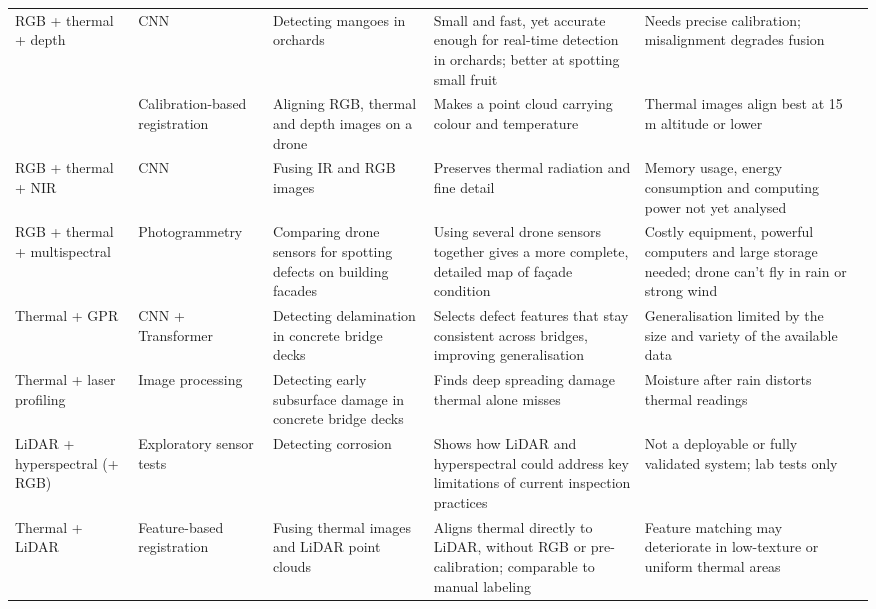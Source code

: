 {\begin{xltabular}{\textwidth}{>{\RaggedRight\arraybackslash}p{1.6cm}>{\RaggedRight\arraybackslash}p{2.2cm}>{\RaggedRight\arraybackslash}p{2.3cm}>{\RaggedRight\arraybackslash}X>{\RaggedRight\arraybackslash}Xp{0.95cm}}
\midrule
RGB + thermal + depth & CNN & Detecting mangoes in orchards & Small and fast, yet accurate enough for real-time detection in orchards; better at spotting small fruit & Needs precise calibration; misalignment degrades fusion & \citep{Cao2026} \\
 & Calibration-based registration & Aligning RGB, thermal and depth images on a drone & Makes a point cloud carrying colour and temperature & Thermal images align best at 15 m altitude or lower & \citep{Nooralishahi2022} \\
\midrule
RGB + thermal + NIR & CNN & Fusing IR and RGB images & Preserves thermal radiation and fine detail & Memory usage, energy consumption and computing power not yet analysed & \citep{Laidouni2025} \\
\midrule
RGB + thermal + multispectral & Photogrammetry & Comparing drone sensors for spotting defects on building facades & Using several drone sensors together gives a more complete, detailed map of façade condition & Costly equipment, powerful computers and large storage needed; drone can't fly in rain or strong wind & \citep{Guedes2025} \\
\midrule
Thermal + GPR & CNN + Transformer & Detecting delamination in concrete bridge decks & Selects defect features that stay consistent across bridges, improving generalisation & Generalisation limited by the size and variety of the available data & \citep{Rashidi2026} \\
\midrule
Thermal + laser profiling & Image processing & Detecting early subsurface damage in concrete bridge decks & Finds deep spreading damage thermal alone misses & Moisture after rain distorts thermal readings & \citep{Yamashita2025} \\
\midrule
LiDAR + hyperspectral (+ RGB) & Exploratory sensor tests & Detecting corrosion & Shows how LiDAR and hyperspectral could address key limitations of current inspection practices & Not a deployable or fully validated system; lab tests only & \citep{PallasEnguita2025} \\
\midrule
Thermal + LiDAR & Feature-based registration & Fusing thermal images and LiDAR point clouds & Aligns thermal directly to LiDAR, without RGB or pre-calibration; comparable to manual labeling & Feature matching may deteriorate in low-texture or uniform thermal areas & \citep{Zhu2026a} \\
\end{xltabular}
}


